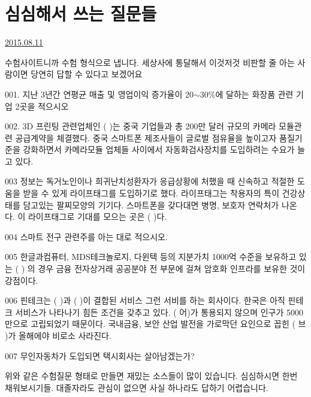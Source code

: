 \section{심심해서 쓰는 질문들}
\href{https://www.kockoc.com/Apoc/243692}{2015.08.11}

\vspace{5mm}

수험사이트니까 수험 형식으로 냅니다.
세상사에 통달해서 이것저것 비판할 줄 아는 사람이면 당연히 답할 수 있다고 보겠어요
\vspace{5mm}

001. 지난 3년간 연평균 매출 및 영업이익 증가율이 20$\sim$30$\%$에 달하는 화장품 관련 기업 2곳을 적으시오
\vspace{5mm}

002. 3D 프린팅 관련업체인 (     )는 중국 기업들과 총 200만 달러 규모의 카메라 모듈관련 공급계약을 체결했다.   중국 스마트폰 제조사들이 글로벌 점유율을 높이고자 품질기준을 강화하면서 카메라모듈 업체들 사이에서 자동화검사장치를 도입하려는 수요가 늘고 있다.
\vspace{5mm}

003 정보는 독거노인이나 희귀난치성환자가 응급상황에 처했을 때 신속하고 적절한 도움을 받을 수 있게 라이프태그를 도입하기로 했다.   라이프태그는 착용자의 특이 건강상태를 담고있는 팔찌모양의 기기다. 스마트폰을 갖다대면 병명, 보호자 연락처가 나온다. 이 라이프태그로 기대를 모으는 곳은 (    )다.
\vspace{5mm}

004 스마트 전구 관련주를 아는 대로 적으시오.
\vspace{5mm}

005 한글과컴퓨터, MDS테크놀로지, 다윈텍 등의 지분가치 1000억 수준을 보유하고 있는 (       ) 의 경우
금융 전자상거래 공공분야 전 부문에 걸쳐 암호화 인프라를 보유한 것이 강점이다.
\vspace{5mm}

006 핀테크는 (        )과 (        )이 결합된 서비스 그런 서비를 하는 회사이다.
한국은 아직 핀테크 서비스가 나타나기 힘든 조건을 갖추고 있다.
(  어)가 통용되지 않으며 인구가 5000만으로 고립되었기 때문이다.
국내금융, 보안 산업 발전을 가로막던 요인으로 꼽힌 (    브   )가 올해에야 비로소 사라진다.
\vspace{5mm}

007 무인자동차가 도입되면 택시회사는 살아남겠는가?
\vspace{5mm}

위와 같은 수험질문 형태로 만들면 재밌는 소스들이 많이 있습니다.
심심하시면 한번 채워보시기들.
대졸자라도 관심이 없으면 사실 하나라도 답하기 어렵습니다.
\vspace{5mm}

